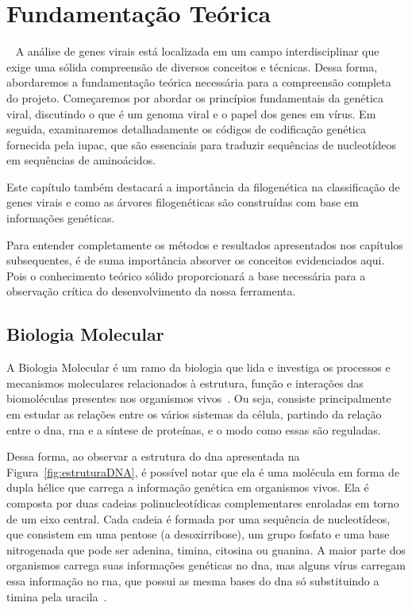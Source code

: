 
\setlength{\parskip}{0.3cm}

\chapter{Fundamentação Teórica}~\label{ch:fundamentacao}
A análise de genes virais está localizada em um campo interdisciplinar que exige uma sólida compreensão de diversos conceitos e técnicas. Dessa forma, abordaremos a fundamentação teórica necessária para a compreensão completa do projeto. Começaremos por abordar os princípios fundamentais da genética viral, discutindo o que é um genoma viral e o papel dos genes em vírus. Em seguida, examinaremos detalhadamente os códigos de codificação genética fornecida pela \gls{iupac}, que são essenciais para traduzir sequências de nucleotídeos em sequências de aminoácidos.

Este capítulo também destacará a importância da filogenética na classificação de genes virais e como as árvores filogenéticas são construídas com base em informações genéticas.

Para entender completamente os métodos e resultados apresentados nos capítulos subsequentes, é de suma importância absorver os conceitos evidenciados aqui. Pois o conhecimento teórico sólido proporcionará a base necessária para a observação crítica do desenvolvimento da nossa ferramenta.

\section{Biologia Molecular}
A Biologia Molecular é um ramo da biologia que lida e investiga os processos e mecanismos moleculares relacionados à estrutura, função e interações das biomoléculas presentes nos organismos vivos~\cite{alberts_biologia_2017}. Ou seja, consiste principalmente em estudar as relações entre os vários sistemas da célula, partindo da relação entre o \gls{dna}, \gls{rna} e a síntese de proteínas, e o modo como essas são reguladas.

Dessa forma, ao observar a estrutura do \gls{dna} apresentada na Figura~\ref{fig:estruturaDNA}, é possível notar que ela é uma molécula em forma de dupla hélice que carrega a informação genética em organismos vivos. Ela é composta por duas cadeias polinucleotídicas complementares enroladas em torno de um eixo central. Cada cadeia é formada por uma sequência de nucleotídeos, que consistem em uma pentose (a desoxirribose), um grupo fosfato e uma base nitrogenada que pode ser \gls{adenina}, \gls{timina}, \gls{citosina} ou \gls{guanina}. A maior parte dos organismos carrega suas informações genéticas no \gls{dna}, mas alguns vírus carregam essa informação no \gls{rna}, que possui as mesma bases do \gls{dna} só substituindo a \gls{timina} pela \gls{uracila}~\cite{genetica_peter_2017}.

